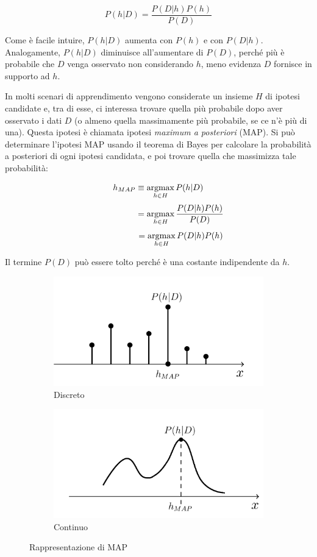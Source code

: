 $$ P(h|D) = \frac{P(D|h) P(h)}{P(D)} $$

Come è facile intuire, $P(h|D)$ aumenta con $P(h)$ e con $P(D|h)$. Analogamente, $P(h|D)$ diminuisce all'aumentare di $P(D)$, perché più è probabile che $D$ venga osservato non considerando $h$, meno evidenza $D$ fornisce in supporto ad $h$.

In molti scenari di apprendimento vengono considerate un insieme $H$ di ipotesi candidate e, tra di esse, ci interessa trovare quella più probabile dopo aver osservato i dati $D$ (o almeno quella massimamente più probabile, se ce n'è più di una). Questa ipotesi è chiamata ipotesi \emph{maximum a posteriori} (MAP). Si può determinare l'ipotesi MAP usando il teorema di Bayes per calcolare la probabilità a posteriori di ogni ipotesi candidata, e poi trovare quella che massimizza tale probabilità:

$$h_{MAP} \equiv \operatorname*{argmax}_{h \in H} P(h|D) $$
$$\hphantom{1111111111} = \operatorname*{argmax}_{h \in H} \frac{P(D|h) P(h)}{P(D)} $$
$$\hphantom{1111111111} = \operatorname*{argmax}_{h \in H} P(D|h) P(h) $$

\noindent
Il termine $P(D)$ può essere tolto perché è una costante indipendente da $h$.

\begin{figure}[htbp!]
	\begin{subfigure}{.5\textwidth}
		\centering
		\includegraphics[width=.8\linewidth]{./images/discr}
		\caption{Discreto}
		\label{fig:discr}
	\end{subfigure}
	\begin{subfigure}{.5\textwidth}
		\centering
		\includegraphics[width=.8\linewidth]{./images/cont}
		\caption{Continuo}
		\label{fig:cont}
	\end{subfigure}
	\caption{Rappresentazione di MAP}
	\label{fig:hmap}
\end{figure}

